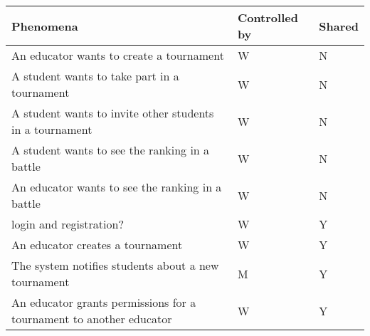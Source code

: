 \begin{center} %
    \begin{longtable}{|p{8.7cm}|p{3cm}|p{3cm}|}
        \caption[Phenomena Table]{}
        \label{table:phenomena}
        \endlastfoot
        \hline
        \rowcolor{gray!50}
        \textbf{Phenomena}                                                                                                                    & \textbf{Controlled by} & \textbf{Shared} \\ \hline
        An educator wants to create a tournament                                                                                              & W                      & N               \\ \hline
        A student wants to take part in a tournament                                                                                          & W                      & N               \\ \hline
        A student wants to invite other students in a tournament                                                                              & W                      & N               \\ \hline
        A student wants to see the ranking in a battle                                                                                        & W                      & N               \\ \hline
        An educator wants to see the ranking in a battle                                                                                      & W                      & N               \\ \hline
        login and registration?                                                                                                               & W                      & Y               \\ \hline
        An educator creates a tournament                                                                                                      & W                      & Y               \\ \hline
        The system notifies students about a new tournament                                                                                   & M                      & Y               \\ \hline
        An educator grants permissions for a tournament to another educator                                                                   & W                      & Y               \\ \hline

\end{longtable}
\end{center}
